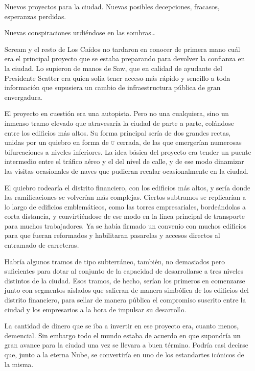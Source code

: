 Nuevos proyectos para la ciudad. Nuevas posibles decepciones, fracasos, esperanzas perdidas.

Nuevas conspiraciones urdiéndose en las sombras\dots

\fancyparbreak
Scream y el resto de Los Caídos no tardaron en conocer de primera mano cuál era el principal proyecto que se estaba preparando para devolver la confianza en la ciudad. Lo supieron de manos de Saw, que en calidad de ayudante del Presidente Scatter era quien solía tener acceso más rápido y sencillo a toda información que supusiera un cambio de infraestructura pública de gran envergadura.

El proyecto en cuestión era una autopista. Pero no una cualquiera, sino un inmenso tramo elevado que atravesaría la ciudad de parte a parte, colándose entre los edificios más altos. Su forma principal sería de dos grandes rectas, unidas por un quiebro en forma de \textsc{u} cerrada, de las que emergerían numerosas bifurcaciones a niveles inferiores. La idea básica del proyecto era tender un puente intermedio entre el tráfico aéreo y el del nivel de calle, y de ese modo dinamizar las visitas ocasionales de naves que pudieran recalar ocasionalmente en la ciudad.

El quiebro rodearía el distrito financiero, con los edificios más altos, y sería donde las ramificaciones se volverían más complejas. Ciertos subtramos se replicarían a lo largo de edificios emblemáticos, como las torres empresariales, bordeándolas a corta distancia, y convirtiéndose de ese modo en la línea principal de transporte para muchos trabajadores. Ya se había firmado un convenio con muchos edificios para que fueran reformados y habilitaran pasarelas y accesos directos al entramado de carreteras.

Habría algunos tramos de tipo subterráneo, también, no demasiados pero suficientes para dotar al conjunto de la capacidad de desarrollarse a tres niveles distintos de la ciudad. Esos tramos, de hecho, serían los primeros en comenzarse junto con segmentos aislados que salieran de manera simbólica de los edificios del distrito financiero, para sellar de manera pública el compromiso suscrito entre la ciudad y los empresarios a la hora de impulsar su desarrollo.

La cantidad de dinero que se iba a invertir en ese proyecto era, cuanto menos, demencial. Sin embargo todo el mundo estaba de acuerdo en que supondría un gran avance para la ciudad una vez se llevara a buen término. Podría casi decirse que, junto a la eterna Nube, se convertiría en uno de los estandartes icónicos de la misma.

